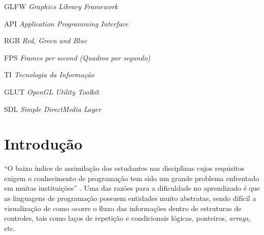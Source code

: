 \documentclass[12pt, %
openright,
oneside, %
a4paper,    %
brazil]{facom-ufu-abntex2}
\begin{document}
\begin{siglas} %
  \item[GLFW] \textit{Graphics Library Framework}
  \item[API] \textit{Application Programming Interface}
  \item[RGB] \textit{Red, Green and Blue}
  \item[FPS] \textit{Frames per second (Quadros por segundo)}
  \item[TI] \textit{Tecnologia da Informação}
  \item[GLUT] \textit{OpenGL Utility Toolkit}
  \item[SDL] \textit{Simple DirectMedia Layer}
\end{siglas}


\tableofcontents*
\cleardoublepage





\textual



\chapter[Introdução]{Introdução}
``O baixo índice de assimilação dos estudantes nas disciplinas cujos requisitos exigem o conhecimento de programação tem sido um grande problema enfrentado em muitas instituições'' \cite{de2004ferramenta}. Uma das razões para a dificuldade no aprendizado é que as linguagens de programação possuem entidades muito abstratas, sendo difícil a visualização de como ocorre o fluxo das informações dentro de estruturas de controles, tais como laços de repetição e condicionais lógicas, ponteiros, \textit{arrays}, etc.
\end{document}
